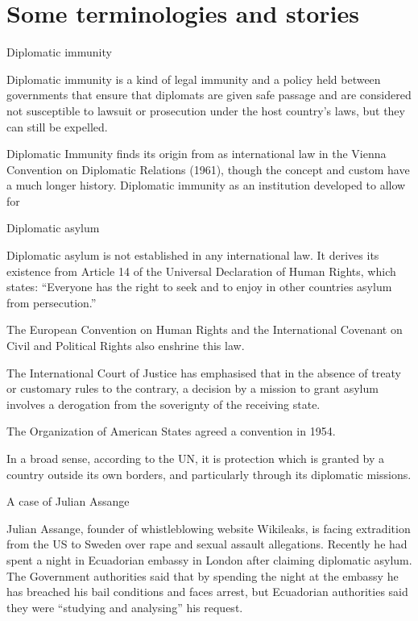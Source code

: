 \documentclass[
  openany]{book}
\begin{document}
\hypertarget{some-terminologies-and-stories}{%
\section{Some terminologies and stories}\label{some-terminologies-and-stories}}

Diplomatic immunity

Diplomatic immunity is a kind of legal immunity and a policy held between governments that ensure that diplomats are given safe passage and are considered not susceptible to lawsuit or prosecution under the host country's laws, but they can still be expelled.

Diplomatic Immunity finds its origin from as international law in the Vienna Convention on Diplomatic Relations (1961), though the concept and custom have a much longer history. Diplomatic immunity as an institution developed to allow for

Diplomatic asylum

Diplomatic asylum is not established in any international law. It derives its existence from Article 14 of the Universal Declaration of Human Rights, which states: ``Everyone has the right to seek and to enjoy in other countries asylum from persecution.''

The European Convention on Human Rights and the International Covenant on Civil and Political Rights also enshrine this law.

The International Court of Justice has emphasised that in the absence of treaty or customary rules to the contrary, a decision by a mission to grant asylum involves a derogation from the soverignty of the receiving state.

The Organization of American States agreed a convention in 1954.

In a broad sense, according to the UN, it is protection which is granted by a country outside its own borders, and particularly through its diplomatic missions.

A case of Julian Assange

Julian Assange, founder of whistleblowing website Wikileaks, is facing extradition from the US to Sweden over rape and sexual assault allegations. Recently he had spent a night in Ecuadorian embassy in London after claiming diplomatic asylum. The Government authorities said that by spending the night at the embassy he has breached his bail conditions and faces arrest, but Ecuadorian authorities said they were ``studying and analysing'' his request.
\end{document}
